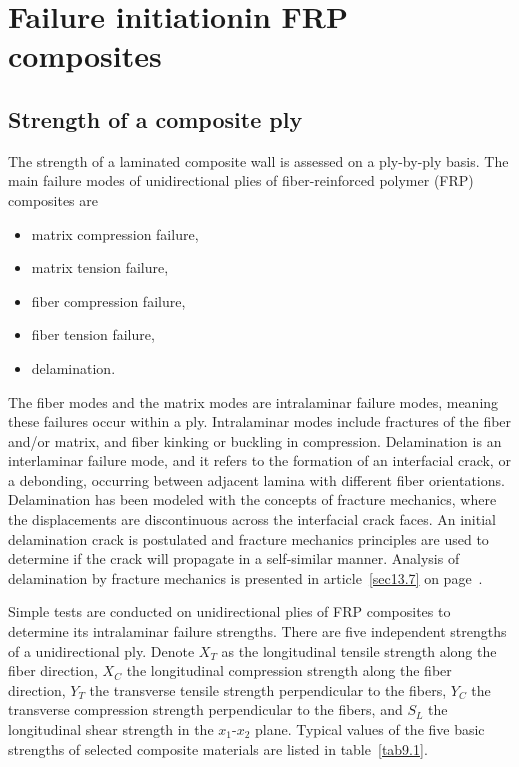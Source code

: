 \documentclass{AeroStructure-ERJohnson}
\begin{document}
\mainmatter

\setcounter{page}{247}
\setcounter{chapter}{8}

\chapter[Failure initiation in FRP composites]{Failure initiation\break in FRP composites} \label{ch9}

\section{Strength of a composite ply} \label{sec9.1}

The strength of a laminated composite wall is assessed on a ply-by-ply basis. The main failure modes of unidirectional plies of fiber-reinforced polymer (FRP) composites are
\begin{itemize}
\item matrix compression failure,
\item matrix tension failure,
\item fiber compression failure,
\item fiber tension failure,
\item delamination.
\end{itemize}
The fiber modes and the matrix modes are intralaminar failure modes, meaning these failures occur within a ply. Intralaminar modes include fractures of the fiber and/or matrix, and fiber kinking or buckling in compression. Delamination is an interlaminar failure mode, and it refers to the formation of an interfacial crack, or a debonding, occurring between adjacent lamina with different fiber orientations. Delamination has been modeled with the concepts of fracture mechanics, where the displacements are discontinuous across the interfacial crack faces. An initial delamination crack is postulated and fracture mechanics principles are used to determine if the crack will propagate in a self-similar manner. Analysis of delamination by fracture mechanics is presented in article~\ref{sec13.7} on page~\pageref{sec13.7}.

Simple tests are conducted on unidirectional plies of FRP composites to determine its intralaminar failure strengths. There are five independent strengths of a unidirectional ply. Denote $X_{{T}}$ as the longitudinal tensile strength along the fiber direction, $X_{{C}}$ the longitudinal compression strength along the fiber direction, $Y_{{T}}$ the transverse tensile strength perpendicular to the fibers, $Y_{{C}}$ the transverse compression strength perpendicular to the fibers, and $S_{{L}}$ the longitudinal shear strength in the $x_1${-}$x_2$ plane. Typical values of the five basic strengths of selected composite materials are listed in table~\ref{tab9.1}.
\end{document}

